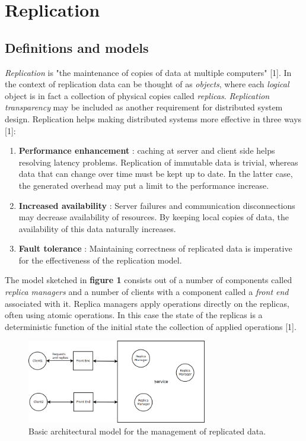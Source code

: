 \chapter{Replication}


\section{Definitions and models}

\emph{Replication} is "the maintenance of copies of data at multiple computers" [1]. In the context of replication data can be thought of as \emph{objects}, where each \emph{logical} object is in fact a collection of physical copies called \emph{replicas}. \emph{Replication transparency} may be included as another requirement for distributed system design. Replication helps making distributed systems more effective in three ways [1]:
\begin{enumerate}
	\item \textbf{Performance enhancement} : caching at server and client side helps resolving latency problems. Replication of immutable data is trivial, whereas data that can change over time must be kept up to date. In the latter case, the generated overhead may put a limit to the performance increase.
	\item \textbf{Increased availability} : Server failures and communication disconnections may decrease availability of resources. By keeping local copies of data, the availability of this data naturally increases.
	\item \textbf{Fault tolerance} : Maintaining correctness of replicated data is imperative for the effectiveness of the replication model.
\end{enumerate}

The model sketched in \textbf{figure 1} consists out of a number of components called \emph{replica managers} and a number of clients with a component called a \emph{front end} associated with it. Replica managers apply operations directly on the replicas, often using atomic operations. In this case the state of the replicas is a deterministic function of the initial state the collection of applied operations [1].

\begin{figure}
	\begin{center}
		\includegraphics[width=0.7\textwidth]{img/replicationmodel}
	\end{center}
	\caption{Basic architectural model for the management of replicated data.}
	\label{fig:replicationmodel}
\end{figure}



